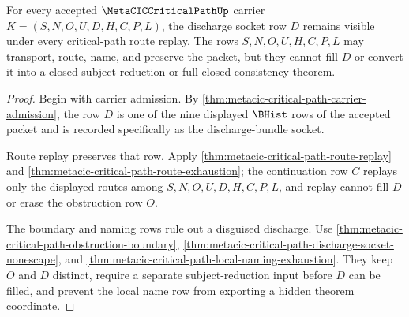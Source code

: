 \begin{theorem}
\label{thm:metacic-critical-path-discharge-row-visibility}
For every accepted $\MetaCICCriticalPathUp$ carrier $K=(S,N,O,U,D,H,C,P,L)$, the discharge socket row $D$ remains visible under every critical-path route replay. The rows $S,N,O,U,H,C,P,L$ may transport, route, name, and preserve the packet, but they cannot fill $D$ or convert it into a closed subject-reduction or full closed-consistency theorem.
\end{theorem}
\begin{proof}
Begin with carrier admission. By \autoref{thm:metacic-critical-path-carrier-admission}, the row $D$ is one of the nine displayed $\BHist$ rows of the accepted packet and is recorded specifically as the discharge-bundle socket.

Route replay preserves that row. Apply \autoref{thm:metacic-critical-path-route-replay} and \autoref{thm:metacic-critical-path-route-exhaustion}; the continuation row $C$ replays only the displayed routes among $S,N,O,U,D,H,C,P,L$, and replay cannot fill $D$ or erase the obstruction row $O$.

The boundary and naming rows rule out a disguised discharge. Use \autoref{thm:metacic-critical-path-obstruction-boundary}, \autoref{thm:metacic-critical-path-discharge-socket-nonescape}, and \autoref{thm:metacic-critical-path-local-naming-exhaustion}. They keep $O$ and $D$ distinct, require a separate subject-reduction input before $D$ can be filled, and prevent the local name row from exporting a hidden theorem coordinate.
\end{proof}

